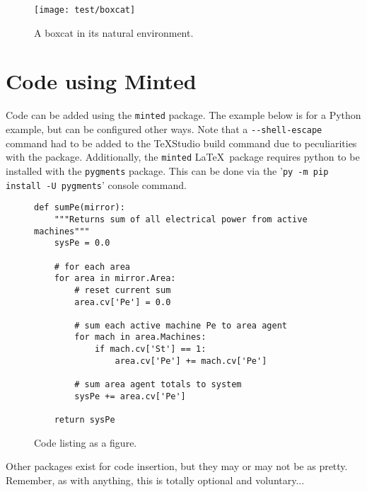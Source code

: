 \begin{figure}[!ht]
	\centering
	\footnotesize
	\texttt{[image: test/boxcat]}
	\caption{A boxcat in its natural environment.}
	\label{fig: boxcat}
\end{figure}\vspace{-1em} %

\section{Code using Minted}
Code can be added using the \verb|minted| package. The example below is for a Python example, but can be configured other ways. Note that a \verb|--shell-escape| command had to be added to the \TeX Studio build command due to peculiarities with the package. 
Additionally, the \verb|minted| \LaTeX\ package requires python to be installed with the \verb|pygments| package.
This can be done via the '\verb|py -m pip install -U pygments|' console command.

\begin{figure}[!ht]
\begin{verbatim}
def sumPe(mirror):
    """Returns sum of all electrical power from active machines"""
    sysPe = 0.0

    # for each area
    for area in mirror.Area:
        # reset current sum
        area.cv['Pe'] = 0.0

        # sum each active machine Pe to area agent
        for mach in area.Machines:
            if mach.cv['St'] == 1:
                area.cv['Pe'] += mach.cv['Pe']

        # sum area agent totals to system
        sysPe += area.cv['Pe']

    return sysPe
\end{verbatim}
	\centering
	\footnotesize
	\caption{Code listing as a figure.}
	\label{fig: codeTest}
\end{figure}\vspace{-1em} %

Other packages exist for code insertion, but they may or may not be as pretty. Remember, as with anything, this is totally optional and voluntary...

\pagebreak
